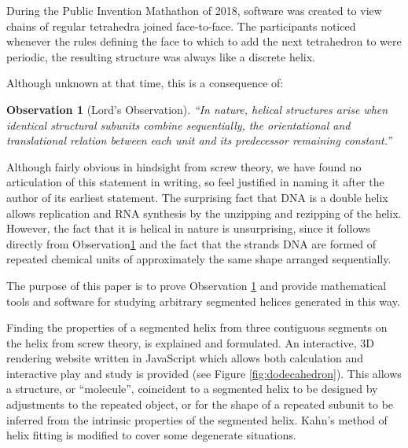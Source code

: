 \documentclass[11pt]{article}
\newtheorem{observation}{Observation}
\begin{document}
{During the Public Invention Mathathon of 2018\cite{read2019mathathon}, software was
created to view chains of regular tetrahedra joined face-to-face.
The participants noticed whenever the rules
defining the face to which to add the next
tetrahedron
to were periodic, the resulting
structure was always like a discrete helix.

Although unknown at that time, this is a consequence of:
\begin{observation}[Lord's Observation]
  “In nature, helical structures arise when identical structural subunits combine sequentially, the orientational and translational relation between each unit and its predecessor remaining constant.”\cite{lord2002helical}
  \label{obs:lords}
\end{observation}
Although fairly obvious in hindsight from screw theory, we have found no articulation of this statement
in writing, so feel justified in naming it after the author of its earliest statement.
The surprising fact that DNA is a double helix allows replication and RNA synthesis by the unzipping and rezipping
of the helix.
However, the fact that it is helical in nature is unsurprising, since it follows directly from Observation\ref{obs:lords} and the
fact that the strands DNA are formed of repeated chemical units of approximately the same shape arranged sequentially.

The purpose of this paper is to prove Observation \ref{obs:lords} and provide mathematical
tools and software for studying arbitrary
segmented helices generated in this way.

Finding the properties of a segmented helix from three contiguous segments on the helix from screw theory\cite{abbasi2015review,wittenburg2016kinematics,wiki:screwaxis,kahn1989defining},
is explained and formulated.
An interactive, 3D rendering website written in JavaScript which allows both calculation and
interactive play and study is provided\cite{segmentedhelixinteractive}
(see Figure \ref{fig:dodecahedron}). This allows
a structure, or ``molecule'', coincident to a segmented helix to be designed
by adjustments to the repeated object, or for the shape of
a repeated subunit to be inferred from the intrinsic properties of the
segmented helix.
Kahn's method of helix fitting\cite{kahn1989defining,enkhbayar2008helfit,lee2007qhelix} is modified to cover some degenerate situations.

}
\end{document}
